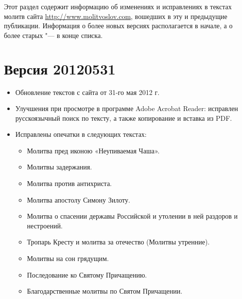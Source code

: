 \renewcommand{\ornament}{uzor_begin_9}

Этот раздел содержит информацию об изменениях и исправлениях в текстах молитв сайта \url{http://www.molitvoslov.com}, вошедших в эту и предыдущие публикации. Информация о более новых версиях располагается в начале, а о более старых "--- в конце списка.


\small

\section*{Версия 20120531}

\begin{itemize}

\item Обновление текстов с сайта от 31-го мая 2012 г.
\item Улучшения при просмотре в программе Adobe Acrobat Reader: исправлен русскоязычный поиск по  тексту, а также копирование и вставка из PDF.
\item Исправлены опечатки в следующих текстах:

\begin{itemize}

\item Молитва пред иконою «Неупиваемая Чаша».
\item Молитвы задержания.
\item Молитва против антихриста.
\item Молитва апостолу Симону Зилоту.
\item Молитва о спасении державы Российской и утолении в ней раздоров и нестроений.
\item Тропарь Кресту и молитва за отечество (Молитвы утренние).
\item Молитвы на сон грядущим.
\item Последование ко Святому Причащению.
\item Благодарственные молитвы по Святом Причащении.

\end{itemize}

\end{itemize}

